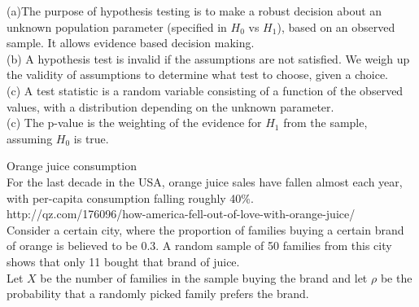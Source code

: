\documentclass[bigtut]{tutorial}\usepackage[]{graphicx}\usepackage[]{color}
\begin{document}
\begin{tutorial}
\begin{questions}


\begin{solution}
(a)The purpose of hypothesis testing is to make a robust decision about an unknown population parameter (specified in $H_{0}$ vs $H_{1}$), based on an observed sample.  It allows evidence based decision making. \\

(b)  A hypothesis test is invalid if the assumptions are not satisfied. We weigh up the validity of assumptions to determine what test to choose, given a choice. \\

(c) A test statistic is a random variable consisting of a function of the observed values, with a distribution depending on the unknown parameter. \\

(c) The p-value is the weighting of the evidence for $H_{1}$ from the sample, assuming $H_{0}$ is true.
\end{solution}


\question  Orange juice consumption  \\

For the last decade in the USA, orange juice sales have fallen almost each year, with per-capita consumption falling roughly 40\%. \\
{\tiny http://qz.com/176096/how-america-fell-out-of-love-with-orange-juice/} \\

Consider a certain city, where the proportion of families buying a certain brand of orange is believed to be 0.3. A random sample of 50 families from this city shows that only 11 bought that brand of juice.  \\

Let $X$ be the number of families in the sample buying the brand and let $\rho$ be the probability that a randomly picked family prefers the brand. \\


\end{questions}
\end{tutorial}
\end{document}
